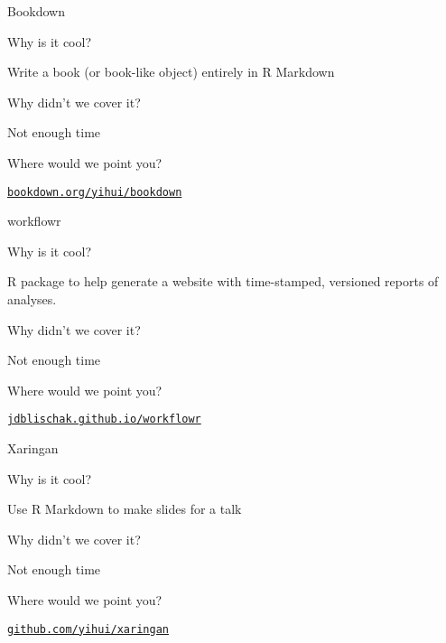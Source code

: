 \documentclass[12pt,t]{beamer}
\begin{document}
\begin{frame}[c]{Bookdown}

  \bbi
\item[] Why is it cool?
  \bi
\item Write a book (or book-like object) entirely in R Markdown
  \ei
\item[] Why didn't we cover it?
    \bi
    \item Not enough time
    \ei
\item[] Where would we point you?
    \bi
  \item \href{https://bookdown.org/yihui/bookdown/}{\tt bookdown.org/yihui/bookdown}
   \ei
\ei


\end{frame}







\begin{frame}[c]{workflowr}

  \bbi
\item[] Why is it cool?
  \bi
\item R package to help generate a website with time-stamped,
  versioned reports of analyses.
  \ei
\item[] Why didn't we cover it?
    \bi
    \item Not enough time
    \ei
\item[] Where would we point you?
    \bi
  \item \href{https://jdblischak.github.io/workflowr/}{\tt jdblischak.github.io/workflowr}
   \ei
\ei


\end{frame}





\begin{frame}[c]{Xaringan}

  \bbi
\item[] Why is it cool?
  \bi
\item Use R Markdown to make slides for a talk
  \ei
\item[] Why didn't we cover it?
    \bi
    \item Not enough time
    \ei
\item[] Where would we point you?
    \bi
  \item \href{http://github.com/yihui/xaringan}{\tt github.com/yihui/xaringan}
   \ei
\ei


\end{frame}
\end{document}
